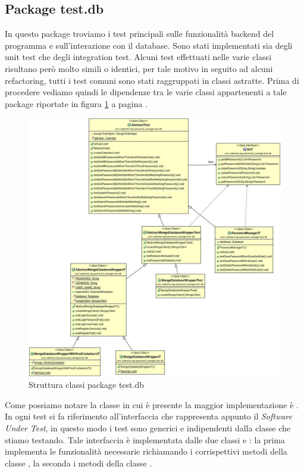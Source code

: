 \subsection{Package test.db}
In questo package troviamo i test principali sulle funzionalità backend del programma e sull'interazione con il database. Sono stati implementati sia degli unit test che degli integration test. Alcuni test effettuati nelle varie classi risultano però molto simili o identici, per tale motivo in seguito ad alcuni refactoring, tutti i test comuni sono stati raggruppati in classi astratte. Prima di procedere vediamo quindi le dipendenze tra le varie classi appartenenti a tale package riportate in figura \ref{fig:strutturaTest} a pagina \pageref{fig:strutturaTest}.
\begin{figure}[h]
		\includegraphics[scale=0.5]{Immagini/StrutturaTest.jpg}
	\caption{Struttura classi package test.db}
	\label{fig:strutturaTest}
\end{figure}
Come possiamo notare la classe in cui è presente la maggior implementazione è . In ogni test si fa riferimento all'interfaccia  che rappresenta appunto il \emph{Software Under Test}, in questo modo i test sono generici e indipendenti dalla classe che stiamo testando. Tale interfaccia è implementata dalle due classi  e : la prima implementa le funzionalità necessarie richiamando i corrispettivi metodi della classe , la seconda i metodi della classe .

